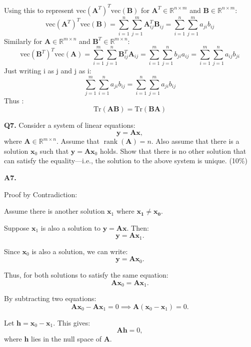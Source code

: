 \documentclass[12pt]{article}
\newcommand{\bvec}[1]{\mathbf{#1}} %
\newcommand{\bmat}[1]{\mathbf{#1}} %
\begin{document}
Using this to represent $\text{vec}(\mathbf{A}^T)^T \text{vec}(\mathbf{B})$ for \( \mathbf{A}^T \in \mathbb{R}^{n \times m} \) and \( \mathbf{B} \in \mathbb{R}^{n \times m} \):
\[
\text{vec}(\mathbf{A}^T)^T \text{vec}(\mathbf{B}) = \sum_{i=1}^n \sum_{j=1}^m \bmat{A}^T_{ij} \bmat{B}_{ij}
=\sum_{i=1}^n \sum_{j=1}^m a_{ji} b_{ij}
\]
Similarly for \( \mathbf{A} \in \mathbb{R}^{m \times n} \) and \( \mathbf{B}^T \in \mathbb{R}^{m \times n} \):
\[
\text{vec}(\mathbf{B}^T)^T \text{vec}(\mathbf{A}) = \sum_{i=1}^m \sum_{j=1}^n \bmat{B}^T_{ij} \bmat{A}_{ij}
= \sum_{i=1}^m \sum_{j=1}^n b_{ji} a_{ij} = \sum_{i=1}^m \sum_{j=1}^n a_{ij} b_{ji} 
\]
Just writing i as j and j as i:
\[
\sum_{j=1}^m \sum_{i=1}^n a_{ji} b_{ij}  = \sum_{i=1}^n \sum_{j=1}^m  a_{ji} b_{ij} 
\]
Thus :
\[
 \text{Tr}(\mathbf{AB}) =  \text{Tr}(\mathbf{BA}) 
\]

\vspace{\baselineskip}
\hline
\vspace{\baselineskip}
\textbf{Q7.} Consider a system of linear equations:
\[
\bvec{y} = \bmat{A} \bvec{x},
\]
where \( \bmat{A} \in \mathbb{R}^{m \times n} \). Assume that \( \operatorname{rank}(\bmat{A}) = n \). Also assume that there is a solution \( \bvec{x}_0 \) such that \( \bvec{y} = \bmat{A} \bvec{x}_0 \) holds. Show that there is no other solution that can satisfy the equality—i.e., the solution to the above system is unique. \hfill (10\%)
\vspace{\baselineskip}

\textbf{A7.}

 Proof by Contradiction:

Assume there is another solution \( \mathbf{x}_1 \) where $\bmat{x_1} \neq \bmat{x_0}$.

Suppose \( \mathbf{x}_1 \) is also a solution to \( \mathbf{y} = \mathbf{A}\mathbf{x} \). Then:
\[
\mathbf{y} = \mathbf{A}\mathbf{x}_1.
\]

Since \( \mathbf{x}_0 \) is also a solution, we can write:
\[
\mathbf{y} = \mathbf{A}\mathbf{x}_0.
\]

Thus, for both solutions to satisfy the same equation:
\[
\mathbf{A}\mathbf{x}_0 = \mathbf{A}\mathbf{x}_1.
\]

By subtracting two equations:
\[
\mathbf{A}\mathbf{x}_0 - \mathbf{A}\mathbf{x}_1 = 0 \implies \mathbf{A}(\mathbf{x}_0 - \mathbf{x}_1) = 0.
\]

Let \( \mathbf{h} = \mathbf{x}_0 - \mathbf{x}_1 \). This gives:
\[
\mathbf{A}\mathbf{h} = 0,
\]
where \( \mathbf{h} \) lies in the null space of \( \mathbf{A} \).
\end{document}
